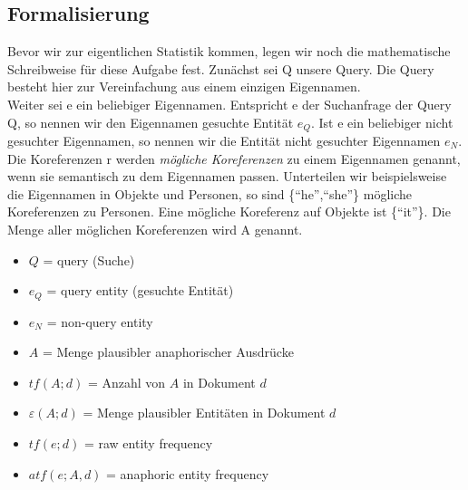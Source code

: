 \subsection{Formalisierung}
Bevor wir zur eigentlichen Statistik kommen, legen wir noch die mathematische Schreibweise für diese Aufgabe fest.
Zunächst sei Q unsere Query. Die Query besteht hier zur Vereinfachung aus einem einzigen Eigennamen.\\
Weiter sei e ein beliebiger Eigennamen. Entspricht e der Suchanfrage der Query Q, so nennen wir den Eigennamen gesuchte Entität $e_Q$. Ist e ein beliebiger nicht gesuchter Eigennamen, so nennen wir die Entität nicht gesuchter Eigennamen $e_N$.\\
Die Koreferenzen r werden \textit{mögliche Koreferenzen} zu einem Eigennamen genannt, wenn sie semantisch zu dem Eigennamen passen. Unterteilen wir beispielsweise die Eigennamen in Objekte und Personen, so sind \{``he'',``she''\} mögliche Koreferenzen zu Personen. Eine mögliche Koreferenz auf Objekte ist \{``it''\}. Die Menge aller möglichen Koreferenzen wird A genannt.\\




 \begin{itemize}
	\item $Q$ = query (Suche)
	\item $e_Q$ = query entity (gesuchte Entität)
	\item $e_N$ = non-query entity
	\item $A$ = Menge plausibler anaphorischer Ausdrücke
	\item $tf(A;d)$ = Anzahl von $A$ in Dokument $d$
	\item $\varepsilon (A;d)$ = Menge plausibler Entitäten in Dokument $d$
	\item $tf(e;d)$ = raw entity frequency
	\item $atf(e;A,d)$ = anaphoric entity frequency
  \end{itemize}
